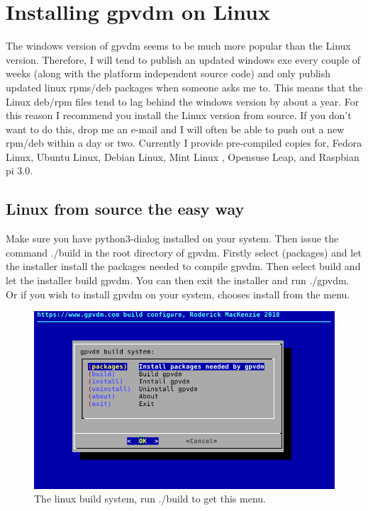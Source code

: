 \documentclass[11pt]{article}
\begin{document}
\section{Installing gpvdm on Linux} \label{installing_on_linux}
The windows version of gpvdm seems to be much more popular than the Linux version.  Therefore, I will tend to publish an updated windows exe every couple of weeks (along with the platform independent source code) and only publish updated linux rpms/deb packages when someone asks me to.  This means that the Linux deb/rpm files tend to lag behind the windows version by about a year.  For this reason I recommend you install the Linux version from source.  If you don't want to do this, drop me an e-mail and I will often be able to push out a new rpm/deb within a day or two.  Currently I provide pre-compiled copies for, Fedora Linux, Ubuntu Linux, Debian Linux, Mint Linux , Opensuse Leap, and Raspbian pi 3.0.


\subsection{Linux from source the easy way}
Make sure you have python3-dialog installed on your system.  Then issue the command ./build in the root directory of gpvdm.  Firstly select (packages) and let the installer install the packages needed to compile gpvdm.  Then select build and let the installer build gpvdm.  You can then exit the installer and run ./gpvdm.  Or if you wish to install gpvdm on your system, chooses install from the menu.

\begin{figure}[ht!]
\centering
\includegraphics[width=120mm]{./images/build.png}
\caption{The linux build system, run ./build to get this menu.  }
\label{fig:build}
\end{figure}
\end{document}
